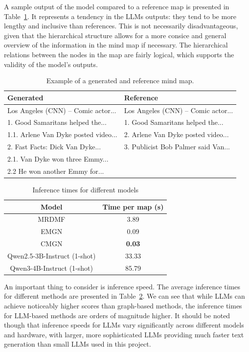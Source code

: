 \documentclass{article}
\begin{document}
A sample output of the model compared to a reference map is presented in Table~\ref{tab:example}. It represents a tendency in the LLMs outputs: they tend to be more lengthy and inclusive than references. This is not necessarily disadvantageous, given that the hierarchical structure allows for a more consice and general overview of the information in the mind map if necessary. The hierarchical relations between the nodes in the map are fairly logical, which supports the validity of the model's outputs. 

\begin{table}[]
    \centering
    \begin{tabular}{|l|l|}
\hline
\textbf{Generated} & \textbf{Reference} \\
\hline
Los Angeles (CNN) -- Comic actor... & Los Angeles (CNN) -- Comic actor... \\
1. Good Samaritans helped the... & 1. Good Samaritans helped the... \\
1.1. Arlene Van Dyke posted video... & 2. Arlene Van Dyke posted video... \\
2. Fast Facts: Dick Van Dyke... & 3. Publicist Bob Palmer said Van... \\
2.1. Van Dyke won three Emmy... &  \\
2.2 He won another Emmy for... & \\
\hline
    \end{tabular}
    \caption{Example of a generated and reference mind map.}
    \label{tab:example}
\end{table}

\begin{table}[]
    \centering
    \begin{tabular}{c|c}
    \toprule
        \textbf{Model} & \textbf{Time per map (s)} \\
    \midrule
        MRDMF & 3.89 \\
        EMGN & 0.09 \\
        CMGN & \textbf{0.03} \\
        Qwen2.5-3B-Instruct (1-shot) & 33.33 \\ 
        Qwen3-4B-Instruct (1-shot) & 85.79 \\ 
    \bottomrule    
    \end{tabular}
    \caption{Inference times for different models}
    \label{tab:time}
\end{table}

An important thing to consider is inference speed. The average inference times for different methods are presented in Table~\ref{tab:time}. We can see that while LLMs can achieve noticeably higher scores than graph-based methods, the inference times for LLM-based methods are orders of magnitude higher. It should be noted though that inference speeds for LLMs vary significantly across different models and hardware, with larger, more sophisticated LLMs providing much faster text generation than small LLMs used in this project.
\end{document}
